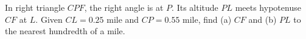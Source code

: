 In right triangle $CPF$, the right angle is at $P$. Its altitude $PL$ meets hypotenuse $CF$ at $L$. Given $CL=0.25$ mile and $CP=0.55$ mile, find (a) $CF$ and (b) $PL$ to the nearest hundredth of a mile.
